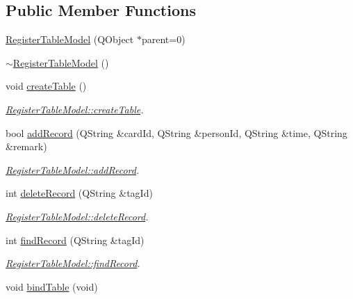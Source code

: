 \subsection*{Public Member Functions}
\begin{DoxyCompactItemize}
\item 
\mbox{\hyperlink{class_register_table_model_a6c069ad4a389c4d7c5102318abfe7ede}{Register\+Table\+Model}} (Q\+Object $\ast$parent=0)
\item 
\mbox{\hyperlink{class_register_table_model_acccc34c26bec67f8b09d677770081f29}{$\sim$\+Register\+Table\+Model}} ()
\item 
void \mbox{\hyperlink{class_register_table_model_ace2abb791a29dcb909072d1a038b8241}{create\+Table}} ()
\begin{DoxyCompactList}\small\item\em \mbox{\hyperlink{class_register_table_model_ace2abb791a29dcb909072d1a038b8241}{Register\+Table\+Model\+::create\+Table}}. \end{DoxyCompactList}\item 
bool \mbox{\hyperlink{class_register_table_model_a00875a777cf37efa655d76c3437d11bf}{add\+Record}} (Q\+String \&card\+Id, Q\+String \&person\+Id, Q\+String \&time, Q\+String \&remark)
\begin{DoxyCompactList}\small\item\em \mbox{\hyperlink{class_register_table_model_a00875a777cf37efa655d76c3437d11bf}{Register\+Table\+Model\+::add\+Record}}. \end{DoxyCompactList}\item 
int \mbox{\hyperlink{class_register_table_model_a5bc3bbf6efa90e52e7759ddf89e8d6bb}{delete\+Record}} (Q\+String \&tag\+Id)
\begin{DoxyCompactList}\small\item\em \mbox{\hyperlink{class_register_table_model_a5bc3bbf6efa90e52e7759ddf89e8d6bb}{Register\+Table\+Model\+::delete\+Record}}. \end{DoxyCompactList}\item 
int \mbox{\hyperlink{class_register_table_model_a5d54272261bd8aaae74929fa468b0271}{find\+Record}} (Q\+String \&tag\+Id)
\begin{DoxyCompactList}\small\item\em \mbox{\hyperlink{class_register_table_model_a5d54272261bd8aaae74929fa468b0271}{Register\+Table\+Model\+::find\+Record}}. \end{DoxyCompactList}\item 
void \mbox{\hyperlink{class_register_table_model_ac5551b9d80a8b16c69007ecd39a0cbf9}{bind\+Table}} (void)

\end{DoxyCompactItemize}
